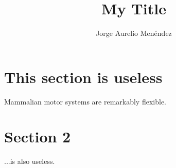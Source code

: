 \documentclass[a4paper]{article}
\title{My Title}
\author{Jorge Aurelio Men\'endez}
\begin{document}
\maketitle
\tableofcontents


\section{This section is useless}

Mammalian motor systems are remarkably flexible.


\section{Section 2}

...is also useless.


% 
% 
\end{document}
